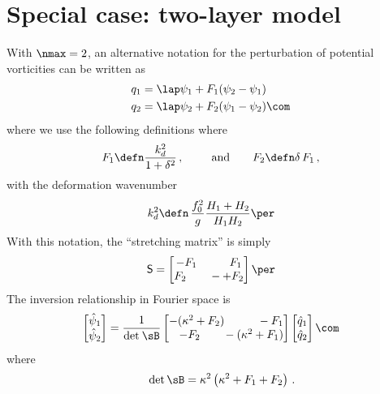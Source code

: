 \documentclass[11pt]{article}
\newcommand{\sS}{\mathsf{S}}
\begin{document}
\section*{Special case: two-layer model}
With $\nmax = 2$, an alternative notation for the perturbation of potential vorticities can be written as
\begin{align}
    q_1 &= \lap \psi_1 + F_1 (\psi_2 - \psi_1) \nonumber\\
    q_2 &= \lap \psi_2 + F_2 (\psi_1  - \psi_2)\com
\end{align}
where we use the following definitions
where
\begin{equation}
F_1 \defn \frac{k_d^2}{1 + \delta^2}\,, \qquad \:\:\text{and} \qquad F_2 \defn \delta \,F_1\,,
\end{equation}
with the deformation wavenumber
\begin{equation}
k_d^2 \defn \, \frac{f_0^2}{g} \frac{H_1+H_2}{H_1 H_2} \per
\end{equation}
With this notation, the ``stretching matrix'' is simply
\begin{equation}
\sS = \begin{bmatrix}
- F_1 \qquad \:\:\:\:F_1\\
F_2 \qquad -  + F_2
\end{bmatrix}\per
\end{equation}
The inversion relationship in Fourier space is
\begin{equation}
\begin{bmatrix}
\hat{\psi}_1\\
\hat{\psi}_2\\
\end{bmatrix}
= \frac{1}{\text{det} \: \sB}
\begin{bmatrix}
-(\kappa^2 + F_2) \qquad \:\:\:\:-F_1\\
\:\:\:\: -F_2 \qquad - (\kappa^2 + F_1)
\end{bmatrix}
\begin{bmatrix}
\hat{q}_1\\
\hat{q}_2\\
\end{bmatrix}\com
\end{equation}
where 
\begin{equation}
\qquad \text{det}\, \sB = \kappa^2\left(\kappa^2 + F_1 + F_2\right)\,.
\end{equation}
\end{document}
